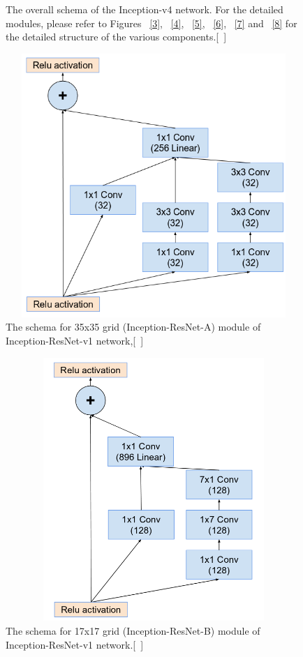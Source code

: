 \documentclass[a4paper,12pt, twoside]{NITKReport}
\begin{document}
\begin{figure}
\begin{minipage}[b]{0.4\textwidth}
    \caption{The overall schema of the Inception-v4 network. For the
detailed modules, please refer to Figures ~\ref{3}, ~\ref{4}, ~\ref{5}, ~\ref{6}, ~\ref{7} and ~\ref{8} for the detailed structure of the various components.[~\cite{szegedy2017inception}]}
    \label{9}
  \end{minipage}
\end{figure}


\begin{figure}[h]
  \centering
    \includegraphics[height=10cm,width=13cm]{figure10.png}
\caption{The  schema  for 35x35 grid  (Inception-ResNet-A) module of Inception-ResNet-v1 network,[~\cite{szegedy2017inception}]}
\label{10}
\end{figure}

\begin{figure}[h]
  \centering
    \includegraphics[height=10cm,width=13cm]{figure11.png}
    \caption{The  schema  for 17x17 grid  (Inception-ResNet-B) module of Inception-ResNet-v1 network.[~\cite{szegedy2017inception}]}
    \label{11}
 
\end{figure}
\end{document}
